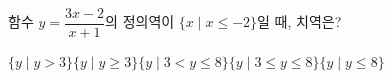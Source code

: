 함수 $y=\dfrac{3x-2}{x+1}$의 정의역이 $\{x \mid x\le -2\}$일 때, 치역은?
\begin{choicesii}{$\{y \mid y>3\}$}{$\{y \mid y\ge 3\}$}{$\{y \mid 3<y\le 8\}$}{$\{y \mid 3\le y\le 8\}$}{$\{y \mid y\le 8\}$}\end{choicesii}
